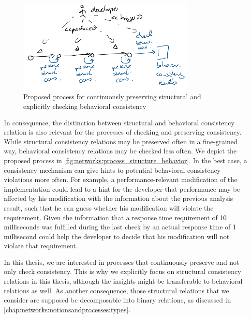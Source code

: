 \begin{figure}
    \centering
    \includegraphics[width=0.8\textwidth]{figures/prologue/process_structure_behavior.png}
    \caption[Process for preserving structural and behavioral consistency]{Proposed process for continuously preserving structural and explicitly checking behavioral consistency}
    \label{fig:networks:process_structure_behavior}
\end{figure}

In consequence, the distinction between structural and behavioral consistency relation is also relevant for the processes of checking and preserving consistency.
While structural consistency relations may be preserved often in a fine-grained way, behavioral consistency relations may be checked less often.
We depict the proposed process in \autoref{fig:networks:process_structure_behavior}.
In the best case, a consistency mechanism can give hints to potential behavioral consistency violations more often.
For example, a performance-relevant modification of the implementation could lead to a hint for the developer that performance may be affected by his modification with the information about the previous analysis result, such that he can guess whether his modification will violate the requirement.
Given the information that a response time requirement of 10 milliseconds was fulfilled during the last check by an actual response time of 1 millisecond could help the developer to decide that his modification will not violate that requirement.

In this thesis, we are interested in processes that continuously preserve and not only check consistency.
This is why we explicitly focus on structural consistency relations in this thesis, although the insights might be transferable to behavioral relations as well.
As another consequence, those structural relations that we consider are supposed be decomposable into binary relations, as discussed in \autoref{chap:networks:notionsandprocesses:types}.



